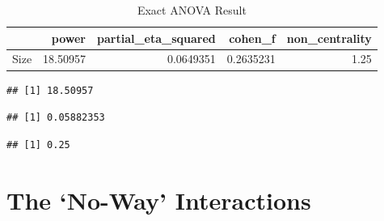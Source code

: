 \documentclass[]{book}
\newenvironment{Shaded}{\begin{snugshade}}{\end{snugshade}}
\newcommand{\CommentTok}[1]{\textcolor[rgb]{0.56,0.35,0.01}{\textit{#1}}}
\newcommand{\DecValTok}[1]{\textcolor[rgb]{0.00,0.00,0.81}{#1}}
\newcommand{\KeywordTok}[1]{\textcolor[rgb]{0.13,0.29,0.53}{\textbf{#1}}}
\newcommand{\NormalTok}[1]{#1}
\newcommand{\OperatorTok}[1]{\textcolor[rgb]{0.81,0.36,0.00}{\textbf{#1}}}
\newcommand{\StringTok}[1]{\textcolor[rgb]{0.31,0.60,0.02}{#1}}
\begin{document}
\begin{table}[!h]

\caption{\label{tab:unnamed-chunk-238}Exact ANOVA Result}
\centering
\begin{tabular}{l|r|r|r|r}
\hline
  & power & partial\_eta\_squared & cohen\_f & non\_centrality\\
\hline
Size & 18.50957 & 0.0649351 & 0.2635231 & 1.25\\
\hline
\end{tabular}
\end{table}

\begin{Shaded}
\end{Shaded}

\begin{verbatim}
## [1] 18.50957
\end{verbatim}

\begin{Shaded}
\end{Shaded}

\begin{verbatim}
## [1] 0.05882353
\end{verbatim}

\begin{Shaded}
\end{Shaded}

\begin{verbatim}
## [1] 0.25
\end{verbatim}

\hypertarget{the-no-way-interactions}{%
\chapter{The `No-Way' Interactions}\label{the-no-way-interactions}}
\end{document}
